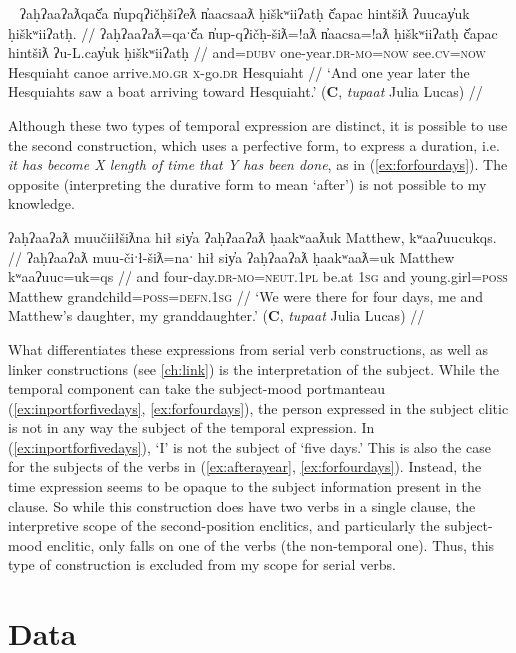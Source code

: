 \ex~ \label{ex:afterayear}
\begingl
\glpreamble ʔaḥʔaaʔaƛqač̓a n̓upqʔičḥšiʔeƛ n̓aacsaaƛ ḥiškʷiiʔatḥ č̓apac hintšiƛ ʔuucay̓uk ḥiškʷiiʔatḥ. //
\gla ʔaḥʔaaʔaƛ=qaˑč̓a n̓up-qʔičḥ-šiƛ=!aƛ n̓aacsa=!aƛ ḥiškʷiiʔatḥ č̓apac hintšiƛ ʔu-L.cay̓uk ḥiškʷiiʔatḥ //
\glb and=\textsc{dubv} one-year.\textsc{dr}-\textsc{mo}=\textsc{now} see.\textsc{cv}=\textsc{now} Hesquiaht canoe arrive.\textsc{mo}.\textsc{gr} \textsc{x}-go.\textsc{dr} Hesquiaht //
\glft `And one year later the Hesquiahts saw a boat arriving toward Hesquiaht.' (\textbf{C}, \textit{tupaat} Julia Lucas) //
\endgl
\xe

Although these two types of temporal expression are distinct, it is possible to use the second construction, which uses a perfective form, to express a duration, i.e. \textit{it has become X length of time that Y has been done}, as in (\ref{ex:forfourdays}). The opposite (interpreting the durative form to mean `after') is not possible to my knowledge.

\ex \label{ex:forfourdays}
\begingl
\glpreamble ʔaḥʔaaʔaƛ muučiiłšiƛna hił siy̓a ʔaḥʔaaʔaƛ ḥaakʷaaƛuk Matthew, kʷaaʔuucukqs. //
\gla ʔaḥʔaaʔaƛ muu-čiˑł-šiƛ=naˑ hił siy̓a ʔaḥʔaaʔaƛ ḥaakʷaaƛ=uk Matthew kʷaaʔuuc=uk=qs //
\glb and four-day.\textsc{dr}-\textsc{mo}=\textsc{neut.1pl} be.at \textsc{1sg} and young.girl=\textsc{poss} Matthew grandchild=\textsc{poss}=\textsc{defn.1sg} //
\glft `We were there for four days, me and Matthew's daughter, my granddaughter.' (\textbf{C}, \textit{tupaat} Julia Lucas) //
\endgl
\xe

What differentiates these expressions from serial verb constructions, as well as linker constructions (see \cref{ch:link}) is the interpretation of the subject. While the temporal component can take the subject-mood portmanteau (\ref{ex:inportforfivedays}, \ref{ex:forfourdays}), the person expressed in the subject clitic is not in any way the subject of the temporal expression. In (\ref{ex:inportforfivedays}), `I' is not the subject of `five days.' This is also the case for the subjects of the verbs in (\ref{ex:afterayear}, \ref{ex:forfourdays}). Instead, the time expression seems to be opaque to the subject information present in the clause. So while this construction does have two verbs in a single clause, the interpretive scope of the second-position enclitics, and particularly the subject-mood enclitic, only falls on one of the verbs (the non-temporal one). Thus, this type of construction is excluded from my scope for serial verbs.

\section{Data} \label{ch:sv:data}

